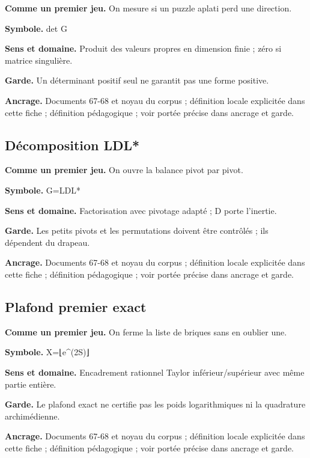 \documentclass[
  9pt,
  a4paper,
]{article}
\begin{document}
\textbf{Comme un premier jeu.} On mesure si un puzzle aplati perd une
direction.

\textbf{Symbole.} det G

\textbf{Sens et domaine.} Produit des valeurs propres en dimension finie
; zéro si matrice singulière.

\textbf{Garde.} Un déterminant positif seul ne garantit pas une forme
positive.

\textbf{Ancrage.} Documents 67-68 et noyau du corpus ; définition locale
explicitée dans cette fiche ; définition pédagogique ; voir portée
précise dans ancrage et garde.

\hypertarget{duxe9composition-ldl}{%
\subsection{Décomposition LDL*}\label{duxe9composition-ldl}}

\textbf{Comme un premier jeu.} On ouvre la balance pivot par pivot.

\textbf{Symbole.} G=LDL*

\textbf{Sens et domaine.} Factorisation avec pivotage adapté ; D porte
l'inertie.

\textbf{Garde.} Les petits pivots et les permutations doivent être
contrôlés ; ils dépendent du drapeau.

\textbf{Ancrage.} Documents 67-68 et noyau du corpus ; définition locale
explicitée dans cette fiche ; définition pédagogique ; voir portée
précise dans ancrage et garde.

\hypertarget{plafond-premier-exact}{%
\subsection{Plafond premier exact}\label{plafond-premier-exact}}

\textbf{Comme un premier jeu.} On ferme la liste de briques sans en
oublier une.

\textbf{Symbole.} X=⌊e\^{}(2S)⌋

\textbf{Sens et domaine.} Encadrement rationnel Taylor
inférieur/supérieur avec même partie entière.

\textbf{Garde.} Le plafond exact ne certifie pas les poids
logarithmiques ni la quadrature archimédienne.

\textbf{Ancrage.} Documents 67-68 et noyau du corpus ; définition locale
explicitée dans cette fiche ; définition pédagogique ; voir portée
précise dans ancrage et garde.
\end{document}
